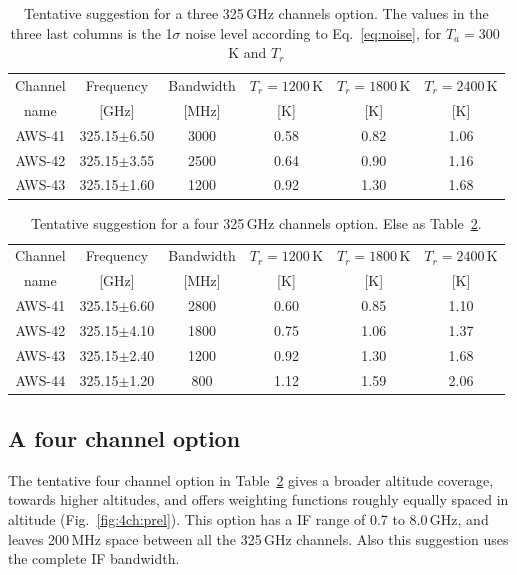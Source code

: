 \documentclass[12pt]{article}
\begin{document}
\begin{table}[!t]
  \centering  
  \begin{tabular}[c]{c|c|c|ccc}
    Channel & Frequency   & Bandwidth & $T_r=1200$\,K
    & $T_r=1800$\,K & $T_r=2400$\,K\\
    name    & [GHz] &  [MHz] & [K]  & [K] & [K]\\
    \hline
    AWS-41  & 325.15$\pm$6.50 & 3000 & 0.58 & 0.82 & 1.06 \\
    AWS-42  & 325.15$\pm$3.55 & 2500 & 0.64 & 0.90 & 1.16 \\
    AWS-43  & 325.15$\pm$1.60 & 1200 & 0.92 & 1.30 & 1.68 \\
    \hline
  \end{tabular}
  \caption{Tentative suggestion for a three 325\,GHz channels option. The
    values in the three last columns is the 1$\sigma$ noise level according to
    Eq.~\ref{eq:noise}, for $T_a=300$\,K and  $T_r$ }
  \label{tab:chs:prel3}
\end{table}

\begin{table}[!t]
  \centering  
  \begin{tabular}[c]{c|c|c|ccc}
    Channel & Frequency   & Bandwidth & $T_r=1200$\,K
    & $T_r=1800$\,K & $T_r=2400$\,K\\
    name    & [GHz] &  [MHz] & [K]  & [K] & [K]\\
    \hline
    AWS-41  & 325.15$\pm$6.60 & 2800 & 0.60 & 0.85 & 1.10 \\
    AWS-42  & 325.15$\pm$4.10 & 1800 & 0.75 & 1.06 & 1.37 \\
    AWS-43  & 325.15$\pm$2.40 & 1200 & 0.92 & 1.30 & 1.68 \\
    AWS-44  & 325.15$\pm$1.20 & \phantom{0}800 & 1.12 & 1.59 & 2.06\\
    \hline
  \end{tabular}
  \caption{Tentative suggestion for a four 325\,GHz channels option. Else as
    Table~\ref{tab:chs:prel4}.}
  \label{tab:chs:prel4}
\end{table}


\subsection{A four channel option}
%
The tentative four channel option in Table~\ref{tab:chs:prel4} gives a broader
altitude coverage, towards higher altitudes, and offers weighting functions
roughly equally spaced in altitude (Fig.~\ref {fig:4ch:prel}). This option has
a IF range of 0.7 to 8.0\,GHz, and leaves 200\,MHz space between all the
325\,GHz channels. Also this suggestion uses the complete IF bandwidth.
\end{document}
